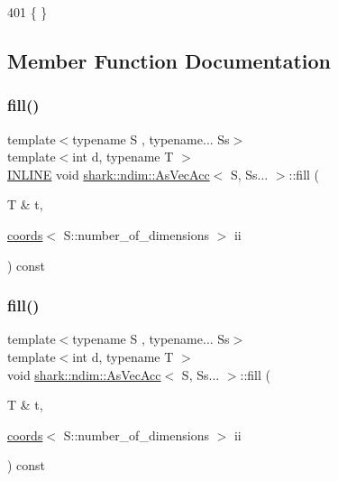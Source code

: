 \begin{DoxyCode}
401 \{ \}
\end{DoxyCode}


\subsection{Member Function Documentation}
\hypertarget{classshark_1_1ndim_1_1_as_vec_acc_3_01_s_00_01_ss_8_8_8_01_4_a30fcd24dec4d442e2822838e1a5eec5b}{}\label{classshark_1_1ndim_1_1_as_vec_acc_3_01_s_00_01_ss_8_8_8_01_4_a30fcd24dec4d442e2822838e1a5eec5b} 
\subsubsection{\texorpdfstring{fill()}{fill()}\hspace{0.1cm}{\footnotesize\ttfamily [1/2]}}
{\footnotesize\ttfamily template$<$typename S , typename... Ss$>$ \\
template$<$int d, typename T $>$ \\
\hyperlink{common_8hpp_a2eb6f9e0395b47b8d5e3eeae4fe0c116}{I\+N\+L\+I\+NE} void \hyperlink{classshark_1_1ndim_1_1_as_vec_acc}{shark\+::ndim\+::\+As\+Vec\+Acc}$<$ S, Ss... $>$\+::fill (\begin{DoxyParamCaption}\item[{T \&}]{t,  }\item[{\hyperlink{structshark_1_1ndim_1_1coords}{coords}$<$ S\+::number\+\_\+of\+\_\+dimensions $>$}]{ii }\end{DoxyParamCaption}) const}

\hypertarget{classshark_1_1ndim_1_1_as_vec_acc_3_01_s_00_01_ss_8_8_8_01_4_a36bb230f01a3a2b77156424f345429c9}{}\label{classshark_1_1ndim_1_1_as_vec_acc_3_01_s_00_01_ss_8_8_8_01_4_a36bb230f01a3a2b77156424f345429c9} 
\subsubsection{\texorpdfstring{fill()}{fill()}\hspace{0.1cm}{\footnotesize\ttfamily [2/2]}}
{\footnotesize\ttfamily template$<$typename S , typename... Ss$>$ \\
template$<$int d, typename T $>$ \\
void \hyperlink{classshark_1_1ndim_1_1_as_vec_acc}{shark\+::ndim\+::\+As\+Vec\+Acc}$<$ S, Ss... $>$\+::fill (\begin{DoxyParamCaption}\item[{T \&}]{t,  }\item[{\hyperlink{structshark_1_1ndim_1_1coords}{coords}$<$ S\+::number\+\_\+of\+\_\+dimensions $>$}]{ii }\end{DoxyParamCaption}) const\hspace{0.3cm}{\ttfamily [inline]}}



